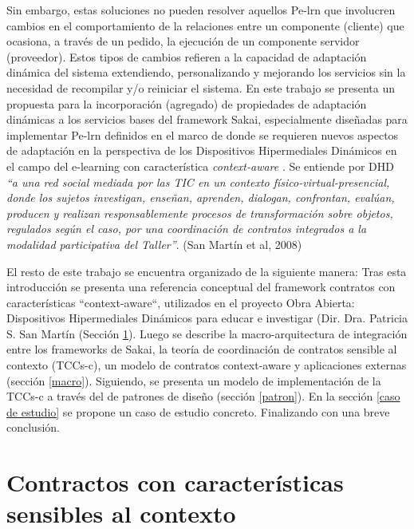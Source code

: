 Sin embargo,  estas soluciones no pueden resolver aquellos Pe-lrn que involucren
cambios en el comportamiento de la relaciones entre un componente (cliente) que
ocasiona, a través de un pedido, la ejecución de un componente servidor
(proveedor). Estos tipos de cambios refieren a la capacidad de adaptación
dinámica del sistema \cite{kcomponent} extendiendo, personalizando y mejorando
los servicios sin la necesidad de recompilar y/o reiniciar el sistema. En este
trabajo se presenta un propuesta para la incorporación (agregado) de propiedades
de adaptación dinámicas a los servicios bases del framework Sakai, especialmente
diseñadas para implementar Pe-lrn definidos en el marco de \cite{ob} donde se
requieren nuevos aspectos de adaptación \cite{libro} en la perspectiva de los
Dispositivos Hipermediales Dinámicos en el campo del e-learning \cite{maxi} con
característica \textit{context-aware} \cite{libro5,libro6}. Se entiende por DHD
\textit{``a una red social mediada por las TIC en un contexto
físico-virtual-presencial, donde los sujetos investigan, enseñan, aprenden,
dialogan, confrontan, evalúan, producen y realizan responsablemente procesos de
transformación sobre objetos, regulados según el caso, por una coordinación de
contratos integrados a la modalidad participativa del Taller''}. (San Martín et
al, 2008) 



El resto de este trabajo se encuentra organizado de la siguiente manera:
Tras esta introducción se presenta una referencia conceptual del framework
contratos con características ``context-aware``, utilizados en el proyecto Obra
Abierta: Dispositivos Hipermediales Dinámicos para educar e investigar (Dir.
Dra. Patricia S. San Martín (Sección \ref{contrato}). Luego se describe la
macro-arquitectura de integración entre los frameworks de Sakai, la teoría de
coordinación de contratos sensible al contexto (TCCs-c), un modelo de contratos
context-aware y aplicaciones externas (sección \ref{macro}). Siguiendo,
se presenta un modelo de implementación de la TCCs-c a través del de patrones de
diseño (sección \ref{patron}). En la sección \ref{caso de estudio} se propone un
caso de estudio concreto. Finalizando con una
breve conclusión.


\section{Contractos con características sensibles al contexto} \label{contrato}

